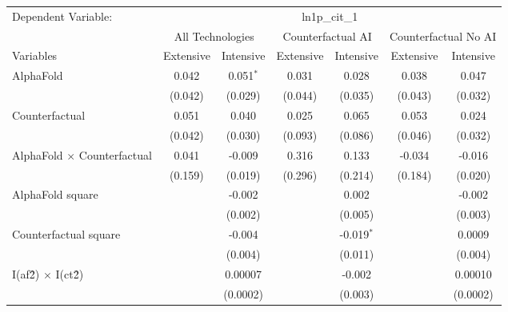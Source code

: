 \begingroup
\centering
\begin{tabular}{lcccccc}
   \tabularnewline \midrule \midrule
   Dependent Variable: & \multicolumn{6}{c}{ln1p\_cit\_1}\\
 & \multicolumn{2}{c}{All Technologies} & \multicolumn{2}{c}{Counterfactual AI} & \multicolumn{2}{c}{Counterfactual No AI} \\
\cmidrule(lr){1-1}\cmidrule(lr){2-3} \cmidrule(lr){4-5} \cmidrule(lr){6-7}
Variables & \multicolumn{1}{c}{Extensive} & \multicolumn{1}{c}{Intensive} & \multicolumn{1}{c}{Extensive} & \multicolumn{1}{c}{Intensive} & \multicolumn{1}{c}{Extensive} & \multicolumn{1}{c}{Intensive} \\
\cmidrule(lr){1-1}\cmidrule(lr){2-2} \cmidrule(lr){3-3} \cmidrule(lr){4-4} \cmidrule(lr){5-5} \cmidrule(lr){6-6} \cmidrule(lr){7-7}
   AlphaFold                          & 0.042   & 0.051$^{*}$ & 0.031   & 0.028        & 0.038   & 0.047\\   
                                      & (0.042) & (0.029)     & (0.044) & (0.035)      & (0.043) & (0.032)\\   
   Counterfactual                     & 0.051   & 0.040       & 0.025   & 0.065        & 0.053   & 0.024\\   
                                      & (0.042) & (0.030)     & (0.093) & (0.086)      & (0.046) & (0.032)\\   
   AlphaFold $\times$ Counterfactual  & 0.041   & -0.009      & 0.316   & 0.133        & -0.034  & -0.016\\   
                                      & (0.159) & (0.019)     & (0.296) & (0.214)      & (0.184) & (0.020)\\   
   AlphaFold square                   &         & -0.002      &         & 0.002        &         & -0.002\\   
                                      &         & (0.002)     &         & (0.005)      &         & (0.003)\\   
   Counterfactual square              &         & -0.004      &         & -0.019$^{*}$ &         & 0.0009\\   
                                      &         & (0.004)     &         & (0.011)      &         & (0.004)\\   
   I(af\^2) $\times$ I(ct\^2)         &         & 0.00007     &         & -0.002       &         & 0.00010\\   
                                      &         & (0.0002)    &         & (0.003)      &         & (0.0002)\\   

\end{tabular}
